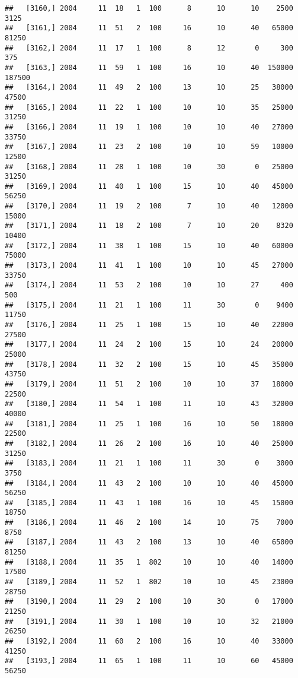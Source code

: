 \documentclass{article}\usepackage[]{graphicx}\usepackage[]{color}
\makeatletter
\newenvironment{kframe}{%
 \def\at@end@of@kframe{}%
 \ifinner\ifhmode%
  \def\at@end@of@kframe{\end{minipage}}%
  \begin{minipage}{\columnwidth}%
 \fi\fi%
 \def\FrameCommand##1{\hskip\@totalleftmargin \hskip-\fboxsep
 \colorbox{shadecolor}{##1}\hskip-\fboxsep
     \hskip-\linewidth \hskip-\@totalleftmargin \hskip\columnwidth}%
 \MakeFramed {\advance\hsize-\width
   \@totalleftmargin\z@ \linewidth\hsize
   \@setminipage}}%
 {\par\unskip\endMakeFramed%
 \at@end@of@kframe}
\newenvironment{knitrout}{}{} %
\makeatother
\begin{document}
\begin{knitrout}
\begin{kframe}
\begin{verbatim}
##   [3160,] 2004     11  18   1  100      8      10      10    2500    3125
##   [3161,] 2004     11  51   2  100     16      10      40   65000   81250
##   [3162,] 2004     11  17   1  100      8      12       0     300     375
##   [3163,] 2004     11  59   1  100     16      10      40  150000  187500
##   [3164,] 2004     11  49   2  100     13      10      25   38000   47500
##   [3165,] 2004     11  22   1  100     10      10      35   25000   31250
##   [3166,] 2004     11  19   1  100     10      10      40   27000   33750
##   [3167,] 2004     11  23   2  100     10      10      59   10000   12500
##   [3168,] 2004     11  28   1  100     10      30       0   25000   31250
##   [3169,] 2004     11  40   1  100     15      10      40   45000   56250
##   [3170,] 2004     11  19   2  100      7      10      40   12000   15000
##   [3171,] 2004     11  18   2  100      7      10      20    8320   10400
##   [3172,] 2004     11  38   1  100     15      10      40   60000   75000
##   [3173,] 2004     11  41   1  100     10      10      45   27000   33750
##   [3174,] 2004     11  53   2  100     10      10      27     400     500
##   [3175,] 2004     11  21   1  100     11      30       0    9400   11750
##   [3176,] 2004     11  25   1  100     15      10      40   22000   27500
##   [3177,] 2004     11  24   2  100     15      10      24   20000   25000
##   [3178,] 2004     11  32   2  100     15      10      45   35000   43750
##   [3179,] 2004     11  51   2  100     10      10      37   18000   22500
##   [3180,] 2004     11  54   1  100     11      10      43   32000   40000
##   [3181,] 2004     11  25   1  100     16      10      50   18000   22500
##   [3182,] 2004     11  26   2  100     16      10      40   25000   31250
##   [3183,] 2004     11  21   1  100     11      30       0    3000    3750
##   [3184,] 2004     11  43   2  100     10      10      40   45000   56250
##   [3185,] 2004     11  43   1  100     16      10      45   15000   18750
##   [3186,] 2004     11  46   2  100     14      10      75    7000    8750
##   [3187,] 2004     11  43   2  100     13      10      40   65000   81250
##   [3188,] 2004     11  35   1  802     10      10      40   14000   17500
##   [3189,] 2004     11  52   1  802     10      10      45   23000   28750
##   [3190,] 2004     11  29   2  100     10      30       0   17000   21250
##   [3191,] 2004     11  30   1  100     10      10      32   21000   26250
##   [3192,] 2004     11  60   2  100     16      10      40   33000   41250
##   [3193,] 2004     11  65   1  100     11      10      60   45000   56250

\end{verbatim}
\end{kframe}
\end{knitrout}
\end{document}
